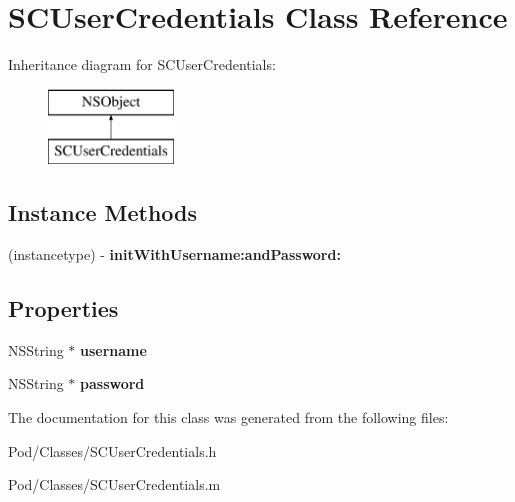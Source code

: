 \hypertarget{interface_s_c_user_credentials}{}\section{S\+C\+User\+Credentials Class Reference}
\label{interface_s_c_user_credentials}
Inheritance diagram for S\+C\+User\+Credentials\+:\begin{figure}[H]
\begin{center}
\leavevmode
\includegraphics[height=2.000000cm]{interface_s_c_user_credentials}
\end{center}
\end{figure}
\subsection*{Instance Methods}
\begin{DoxyCompactItemize}
\item 
(instancetype) -\/ {\bfseries init\+With\+Username\+:and\+Password\+:}\hypertarget{interface_s_c_user_credentials_a033e4984ad4b9106a0bb877cf13ddf38}{}\label{interface_s_c_user_credentials_a033e4984ad4b9106a0bb877cf13ddf38}

\end{DoxyCompactItemize}
\subsection*{Properties}
\begin{DoxyCompactItemize}
\item 
N\+S\+String $\ast$ {\bfseries username}\hypertarget{interface_s_c_user_credentials_ac27e6deacb4b41021749166147602295}{}\label{interface_s_c_user_credentials_ac27e6deacb4b41021749166147602295}

\item 
N\+S\+String $\ast$ {\bfseries password}\hypertarget{interface_s_c_user_credentials_afe84c2d50d088f28b1fc257e27317d89}{}\label{interface_s_c_user_credentials_afe84c2d50d088f28b1fc257e27317d89}

\end{DoxyCompactItemize}


The documentation for this class was generated from the following files\+:\begin{DoxyCompactItemize}
\item 
Pod/\+Classes/S\+C\+User\+Credentials.\+h\item 
Pod/\+Classes/S\+C\+User\+Credentials.\+m\end{DoxyCompactItemize}
